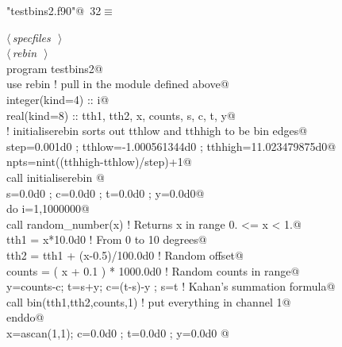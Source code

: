 \documentclass[10pt,a4paper,notitlepage]{article}
\begin{document}
\begin{flushleft} \small
\begin{minipage}{\linewidth}\label{scrap37}\raggedright\small
{} \verb@"testbins2.f90"@\nobreak\ {\footnotesize {32}}$\equiv$
\vspace{-1ex}
\begin{list}{}{} \item
\mbox{}\verb@@\hbox{$\langle\,${\it specfiles}\nobreak\ {\footnotesize {}}$\,\rangle$}\verb@@\\
\mbox{}\verb@@\hbox{$\langle\,${\it rebin}\nobreak\ {\footnotesize {}}$\,\rangle$}\verb@@\\
\mbox{}\verb@      program testbins2@\\
\mbox{}\verb@      use rebin ! pull in the module defined above@\\
\mbox{}\verb@      integer(kind=4) :: i@\\
\mbox{}\verb@      real(kind=8) :: tth1, tth2, x, counts, s, c, t, y@\\
\mbox{}\verb@! initialiserebin sorts out tthlow and tthhigh to be bin edges@\\
\mbox{}\verb@      step=0.001d0 ; tthlow=-1.000561344d0 ; tthhigh=11.023479875d0@\\
\mbox{}\verb@      npts=nint((tthhigh-tthlow)/step)+1@\\
\mbox{}\verb@      call initialiserebin      @\\
\mbox{}\verb@      s=0.0d0 ; c=0.0d0 ; t=0.0d0 ; y=0.0d0@\\
\mbox{}\verb@      do i=1,1000000@\\
\mbox{}\verb@        call random_number(x)            ! Returns x in range 0. <= x < 1.@\\
\mbox{}\verb@        tth1 = x*10.0d0                            ! From 0 to 10 degrees@\\
\mbox{}\verb@        tth2 = tth1 + (x-0.5)/100.0d0                     ! Random offset@\\
\mbox{}\verb@        counts = ( x + 0.1 ) * 1000.0d0          ! Random counts in range@\\
\mbox{}\verb@        y=counts-c; t=s+y; c=(t-s)-y ; s=t    ! Kahan's summation formula@\\
\mbox{}\verb@        call bin(tth1,tth2,counts,1)        ! put everything in channel 1@\\
\mbox{}\verb@      enddo@\\
\mbox{}\verb@      x=ascan(1,1); c=0.0d0 ; t=0.0d0 ; y=0.0d0      @\\

\end{list}
\end{minipage}
\end{flushleft}
\end{document}
